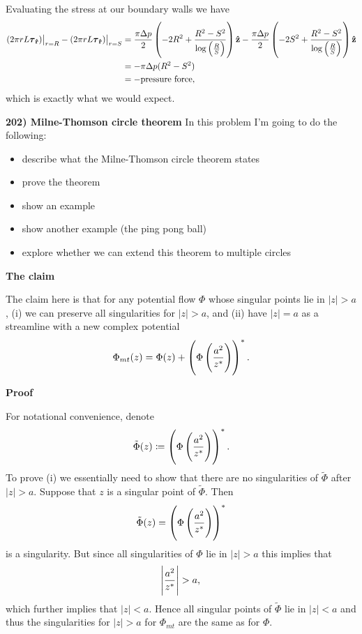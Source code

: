 \documentclass{article}
\def\ti#1{\tilde{#1}}
\newcommand{\rhat}{\mathbf{\hat{r}}}
\newcommand{\zhat}{\mathbf{\hat{z}}}
\newcommand{\tauvec}{\boldsymbol{\tau}}
\begin{document}
%
Evaluating the stress at our boundary walls we have
%
\begin{align*}
    \eval[1]{\del{2 \pi r L \tauvec_\rhat}}_{r = R} - \eval[1]{\del{2 \pi r L \tauvec_\rhat}}_{r = S}
        &= \frac{\pi \Delta p}{2} \del{- 2 R^2 + \frac{R^2 - S^2}{\log\del{\frac{R}{S}}}} \zhat
           - \frac{\pi \Delta p}{2} \del{- 2 S^2 + \frac{R^2 - S^2}{\log\del{\frac{R}{S}}}} \zhat \\
        &= - \pi \Delta p (R^2 - S^2) \\
        &= - \text{pressure force}
        ,
\end{align*}
%
which is exactly what we would expect.


\newpage

\textbf{202) Milne-Thomson circle theorem}
In this problem I'm going to do the following:
%
\begin{itemize}
    \item describe what the Milne-Thomson circle theorem states
    \item prove the theorem
    \item show an example
    \item show another example (the ping pong ball)
    \item explore whether we can extend this theorem to multiple circles
\end{itemize}

\textbf{The claim}

The claim here is that for any potential flow $\Phi$ whose singular
points lie in $|z| > a$, (i) we can preserve all singularities for $|z|
> a$, and (ii) have $|z| = a$ as a streamline with a new complex
potential
%
\begin{equation*}
    \Phi_{mt}(z) = \Phi(z) + \del{\Phi \del{\frac{a^2}{z^*}}}^*
    .
\end{equation*}

\textbf{Proof}

For notational convenience, denote
%
\begin{equation*}
    \ti{\Phi}(z) \coloneqq \del{\Phi \del{\frac{a^2}{z^*}}}^*
    .
\end{equation*}
%
To prove (i) we essentially need to show that there are no singularities
of $\ti\Phi$ after $|z| > a$. Suppose that $z$ is a singular point of
$\ti\Phi$. Then
%
\begin{equation*}
    \ti\Phi(z) = \del{\Phi \del{\frac{a^2}{z^*}}}^*
\end{equation*}
%
is a singularity. But since all singularities of $\Phi$ lie in $|z| >
a$ this implies that
%
\begin{equation*}
    \envert{\frac{a^2}{z^*}} > a
    ,
\end{equation*}
%
which further implies that $|z| < a$. Hence all singular points of
$\ti\Phi$ lie in $|z| < a$ and thus the singularities for $|z| > a$ for
$\Phi_{mt}$ are the same as for $\Phi$.
\end{document}
